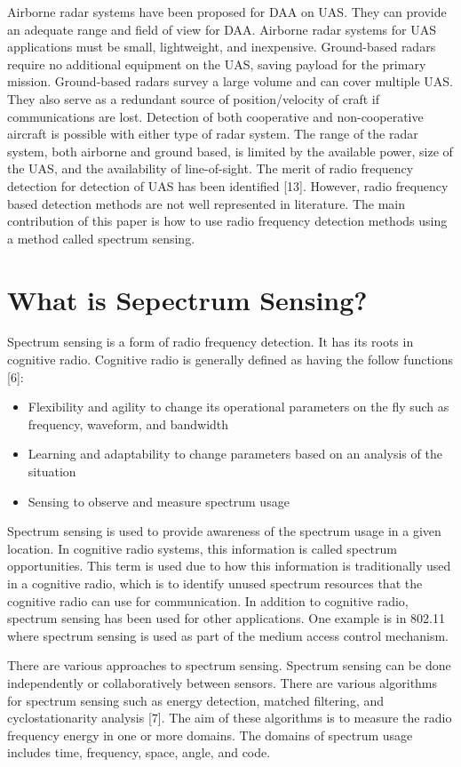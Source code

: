 \documentclass[journal,transmag]{IEEEtran}
\begin{document}
Airborne radar systems have been proposed for DAA on UAS. They can provide an adequate range and field of view for DAA. Airborne radar systems for UAS applications must be small, lightweight, and inexpensive.  Ground-based radars require no additional equipment on the UAS, saving payload for the primary mission. Ground-based radars survey a large volume and can cover multiple UAS. They also serve as a redundant source of position/velocity of craft if communications are lost. Detection of both cooperative and non-cooperative aircraft is possible with either type of radar system. The range of the radar system, both airborne and ground based, is limited by the available power, size of the UAS, and the availability of line-of-sight. 
The merit of radio frequency detection for detection of UAS has been identified [13]. However, radio frequency based detection methods are not well represented in literature. The main contribution of this paper is how to use radio frequency detection methods using a method called spectrum sensing. 

\section{What is Sepectrum Sensing?}
Spectrum sensing is a form of radio frequency detection. It has its roots in cognitive radio. Cognitive radio is generally defined as having the follow functions [6]: 
\begin{itemize}
\item Flexibility and agility to change its operational parameters on the fly such as frequency, waveform, and bandwidth
\item Learning and adaptability to change parameters based on an analysis of the situation
\item Sensing to observe and measure spectrum usage
\end{itemize}
Spectrum sensing is used to provide awareness of the spectrum usage in a given location. In cognitive radio systems, this information is called spectrum opportunities. This term is used due to how this information is traditionally used in a cognitive radio, which is to identify unused spectrum resources that the cognitive radio can use for communication. In addition to cognitive radio, spectrum sensing has been used for other applications. One example is in 802.11 where spectrum sensing is used as part of the medium access control mechanism.

There are various approaches to spectrum sensing. Spectrum sensing can be done independently or collaboratively between sensors. There are various algorithms for spectrum sensing such as energy detection, matched filtering, and cyclostationarity analysis [7]. The aim of these algorithms is to measure the radio frequency energy in one or more domains.  The domains of spectrum usage includes time, frequency, space, angle, and code.
\end{document}
